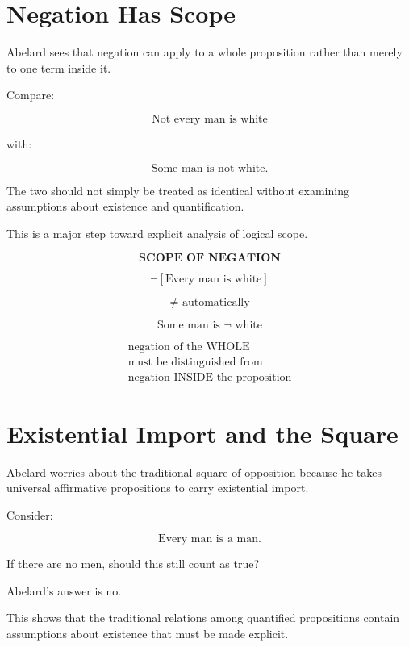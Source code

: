 \documentclass[11pt]{article}
\begin{document}
\section{Negation Has Scope}

Abelard sees that negation can apply to a whole proposition rather
than merely to one term inside it.

Compare:

\[
\text{Not every man is white}
\]

with:

\[
\text{Some man is not white.}
\]

The two should not simply be treated as identical without
examining assumptions about existence and quantification.

This is a major step toward explicit analysis of logical scope.

\begin{whiteboard}
\[
\textbf{SCOPE OF NEGATION}
\]

\[
\neg[\text{Every man is white}]
\]

\[
\neq \text{ automatically}
\]

\[
\text{Some man is }\neg\text{ white}
\]

\[
\boxed{
\begin{array}{c}
\text{negation of the WHOLE}\\
\text{must be distinguished from}\\
\text{negation INSIDE the proposition}
\end{array}
}
\]
\end{whiteboard}

\section{Existential Import and the Square}

Abelard worries about the traditional square of opposition
because he takes universal affirmative propositions to carry
existential import.

Consider:

\[
\text{Every man is a man.}
\]

If there are no men, should this still count as true?

Abelard's answer is no.

This shows that the traditional relations among quantified
propositions contain assumptions about existence that must be
made explicit.
\end{document}
